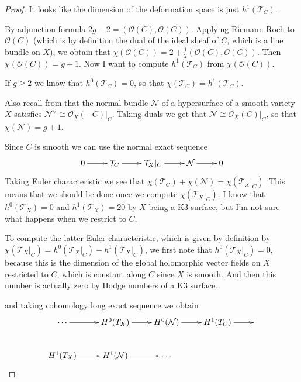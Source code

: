 \begin{proof}
It looks like the dimension of the deformation space is just 
$h^1(\mathcal{T}_C)$.

By
adjunction formula $2g-2=(\mathcal{O}(C),\mathcal{O}(C))$. Applying Riemann-Roch
to $\mathcal{O}(C)$ (which is by definition the dual of the ideal sheaf of $C$,
which is a line bundle on $X$), we obtain that
$\chi(\mathcal{O}(C))=2+\frac{1}{2}(\mathcal{O}(C),\mathcal{O}(C))$. Then
$\boxed{\chi(\mathcal{O}(C))=g+1}$. Now I want to compute $h^1(\mathcal{T}_C)$ from
$\chi(\mathcal{O}(C))$.
 
If $g \geq 2$ we know that $h^0(\mathcal{T}_C)=0$, so that
$\boxed{\chi(\mathcal{T}_C)=h^1(\mathcal{T}_C)}$.

Also recall from \cite[p. 146]{gri} that the normal bundle
$\mathcal{N}$ of a hypersurface of a smooth variety $X$ satisfies
$\mathcal{N}^\vee\cong\mathcal{O}_X(-C)|_{C}$. Taking duals we get that
$\mathcal{N}\cong\mathcal{O}_X(C)|_{C}$, so that 
$\boxed{\chi(\mathcal{N})=g+1}$.

Since $C$ is smooth we can use the normal exact sequence
$$
\xymatrix{
0\ar[r]&\mathcal{T}_C\ar[r]&\mathcal{T}_X|_{C}\ar[r]&\mathcal{N}\ar[r]&0
}
$$
Taking Euler characteristic we see that
$\chi(\mathcal{T}_C)+\chi(\mathcal{N})=\chi(\mathcal{T}_X|_{C})$. 
This means that we should be done once we compute $\chi(\mathcal{T}_X|_{C})$. I
know that $h^0(\mathcal{T}_X)=0$ and $h^1(\mathcal{T}_X)=20$ by $X$ being a K3
surface, but I'm not sure what happens when we restrict to $C$.

\bigskip
To compute the
latter Euler characteristic, which is given by definition by
$\chi(\mathcal{T}_X|_{C})=h^0(\mathcal{T}_X|_{C})-h^1(\mathcal{T}_X|_{C})$, we
first note that $h^0(\mathcal{T}_X|_{C})=0$, because this is the dimension of
the global holomorphic vector fields on $X$
restricted to $C$, which is constant along $C$ since $X$ is
smooth. And then this number is actually zero by Hodge numbers of a K3 surface.

and taking cohomology long exact sequence we obtain
$$
\xymatrix{
\cdots\ar[r]&H^{0}(T_X)\ar[r]&H^{0}(\mathcal{N})\ar[r]&H^{1}(T_C)\ar[r]&\\
H^{1}(T_X)\ar[r]&H^{1}(\mathcal{N})\ar[r]& \cdots
}
$$

\end{proof}

